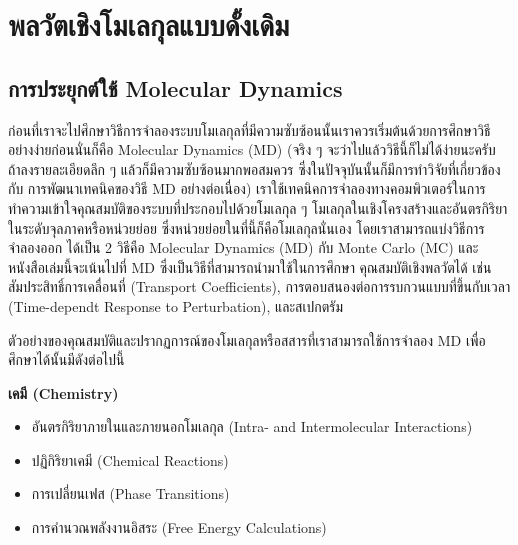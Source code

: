 

\chapter{พลวัตเชิงโมเลกุลแบบดั้งเดิม}
\label{ch:md}

\section{การประยุกต์ใช้ Molecular Dynamics}

ก่อนที่เราจะไปศึกษาวิธีการจำลองระบบโมเลกุลที่มีความซับซ้อนนั้นเราควรเริ่มต้นด้วยการศึกษาวิธีอย่างง่ายก่อนนั่นก็คือ Molecular Dynamics (MD)
(จริง ๆ จะว่าไปแล้ววิธีนี้ก็ไม่ได้ง่ายนะครับ ถ้าลงรายละเอียดลึก ๆ แล้วก็มีความซับซ้อนมากพอสมควร ซึ่งในปัจจุบันนั้นก็มีการทำวิจัยที่เกี่ยวข้องกับ%
การพัฒนาเทคนิคของวิธี MD อย่างต่อเนื่อง) เราใช้เทคนิคการจำลองทางคอมพิวเตอร์ในการทำความเข้าใจคุณสมบัติของระบบที่ประกอบไปด้วยโมเลกุล
ๆ โมเลกุลในเชิงโครงสร้างและอันตรกิริยาในระดับจุลภาคหรือหน่วยย่อย ซึ่งหน่วยย่อยในที่นี้ก็คือโมเลกุลนั่นเอง โดยเราสามารถแบ่งวิธีการจำลองออก%
ได้เป็น 2 วิธีคือ Molecular Dynamics (MD) กับ Monte Carlo (MC) และหนังสือเล่มนี้จะเน้นไปที่ MD ซึ่งเป็นวิธีที่สามารถนำมาใช้ในการศึกษา%
คุณสมบัติเชิงพลวัตได้ เช่น สัมประสิทธิ์การเคลื่อนที่ (Transport Coefficients), การตอบสนองต่อการรบกวนแบบที่ขึ้นกับเวลา (Time-dependt
Response to Perturbation), และสเปกตรัม

ตัวอย่างของคุณสมบัติและปรากฏการณ์ของโมเลกุลหรือสสารที่เราสามารถใช้การจำลอง MD เพื่อศึกษาได้นั้นมีดังต่อไปนี้

\noindent \textbf{เคมี (Chemistry)}

\begin{itemize}[topsep=0pt,noitemsep]
  \setlength\itemsep{0.5em}
  \item อันตรกิริยาภายในและภายนอกโมเลกุล (Intra- and Intermolecular Interactions)

  \item ปฏิกิริยาเคมี (Chemical Reactions)

  \item การเปลี่ยนเฟส (Phase Transitions)

  \item การคำนวณพลังงานอิสระ (Free Energy Calculations)
\end{itemize}

